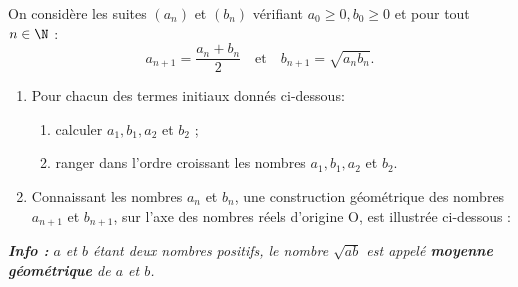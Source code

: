 \documentclass[a4paper,11pt,exos]{nsi} %
\begin{document}
On considère les suites $(a_n)$ et $(b_n)$ vérifiant $a_0\geqslant 0, b_0\geqslant0$ et pour tout $n\in \N$ : 
$$a_{n+1}=\dfrac{a_n+b_n}{2}\quad \text{et}\quad b_{n+1}=\sqrt{a_nb_n}.$$
\begin{enumerate}
	\item 	Pour chacun des termes initiaux donnés ci-dessous:
	\begin{enumerate}[label=\textbullet]
		\item 	calculer $a_1, b_1, a_2$ et $b_2$ ;
		\item 	ranger dans l'ordre croissant les nombres $a_1, b_1, a_2$ et $b_2$.
	\end{enumerate}
	\begin{multicols}{3}
	\end{multicols}
	
	\item 	Connaissant les nombres $a_n$ et $b_n$, une construction géométrique des nombres $a_{n+1}$ et $b_{n+1}$, sur l'axe des nombres réels d'origine O, est illustrée ci-dessous :\\
	
\end{enumerate}
\textit{\textbf{Info :} $a$ et $b$ étant deux nombres positifs, le nombre $\sqrt{ab}$ est appelé \textbf{moyenne géométrique} de $a$ et $b$.}
\end{document}

